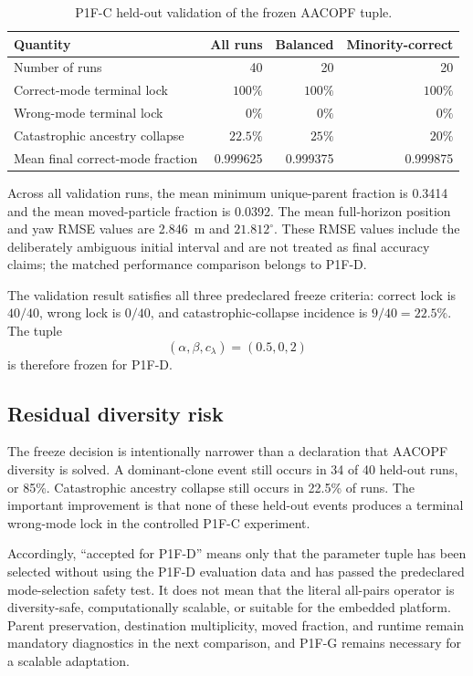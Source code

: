 \begin{table}[htbp]
    \centering
    \caption{P1F-C held-out validation of the frozen AACOPF tuple.}
    \label{tab:p1fc_validation}
    \begin{tabular}{lrrr}
        \toprule
        Quantity & All runs & Balanced & Minority-correct\\
        \midrule
        Number of runs & 40 & 20 & 20\\
        Correct-mode terminal lock & $100\%$ & $100\%$ & $100\%$\\
        Wrong-mode terminal lock & $0\%$ & $0\%$ & $0\%$\\
        Catastrophic ancestry collapse & $22.5\%$ & $25\%$ & $20\%$\\
        Mean final correct-mode fraction & 0.999625 & 0.999375 & 0.999875\\
        \bottomrule
    \end{tabular}
\end{table}

Across all validation runs, the mean minimum unique-parent fraction is 0.3414 and the mean moved-particle fraction is 0.0392. The mean full-horizon position and yaw RMSE values are \SI{2.846}{m} and $21.812^\circ$. These RMSE values include the deliberately ambiguous initial interval and are not treated as final accuracy claims; the matched performance comparison belongs to P1F-D.

The validation result satisfies all three predeclared freeze criteria: correct lock is $40/40$, wrong lock is $0/40$, and catastrophic-collapse incidence is $9/40=22.5\%$. The tuple
\begin{equation}
    (\alpha,\beta,c_\lambda)=(0.5,0,2)
\end{equation}
is therefore frozen for P1F-D.

\subsection{Residual diversity risk}
The freeze decision is intentionally narrower than a declaration that AACOPF diversity is solved. A dominant-clone event still occurs in 34 of 40 held-out runs, or 85\%. Catastrophic ancestry collapse still occurs in 22.5\% of runs. The important improvement is that none of these held-out events produces a terminal wrong-mode lock in the controlled P1F-C experiment.

Accordingly, ``accepted for P1F-D'' means only that the parameter tuple has been selected without using the P1F-D evaluation data and has passed the predeclared mode-selection safety test. It does not mean that the literal all-pairs operator is diversity-safe, computationally scalable, or suitable for the embedded platform. Parent preservation, destination multiplicity, moved fraction, and runtime remain mandatory diagnostics in the next comparison, and P1F-G remains necessary for a scalable adaptation.

